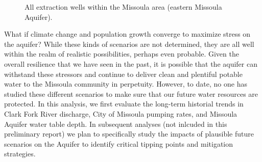\documentclass[a4paper, 12pt]{report}
\begin{document}
\begin{figure}


\caption{\label{fig-extract-map}All extraction wells within the Missoula
area (eastern Missoula Aquifer).}

\end{figure}%

What if climate change and population growth converge to maximize stress
on the aquifer? While these kinds of scenarios are not determined, they
are all well within the realm of realistic possibilities, perhaps even
probable. Given the overall resilience that we have seen in the past, it
is possible that the aquifer can withstand these stressors and continue
to deliver clean and plentiful potable water to the Missoula community
in perpetuity. However, to date, no one has studied these different
scenarios to make sure that our future water resources are protected. In
this analysis, we first evaluate the long-term historial trends in Clark
Fork River discharge, City of Missoula pumping rates, and Missoula
Aquifer water table depth. In subsequent analyses (not inlcuded in this
preliminary report) we plan to specifically study the impacts of
plausible future scenarios on the Aquifer to identify critical tipping
points and mitigation strategies.

\printbibliography
\end{document}
